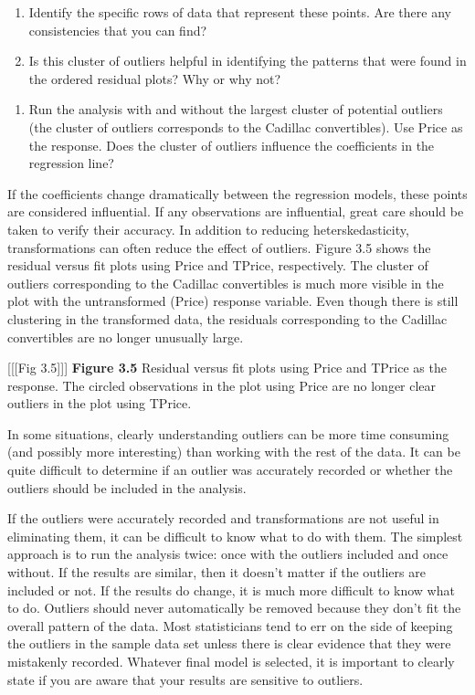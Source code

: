 \documentclass[
]{report}
\providecommand{\tightlist}{%
  \setlength{\itemsep}{0pt}\setlength{\parskip}{0pt}}
\theoremstyle{definition}
\theoremstyle{definition}
\theoremstyle{definition}
\theoremstyle{definition}
\theoremstyle{remark}
\begin{document}
\begin{enumerate}
\def\labelenumi{\alph{enumi}.}
\item
  Identify the specific rows of data that represent these points. Are there any consistencies that you can find?
\item
  Is this cluster of outliers helpful in identifying the patterns that were found in the ordered residual plots? Why or why not?
\end{enumerate}

\begin{enumerate}
\def\labelenumi{\arabic{enumi}.}
\setcounter{enumi}{11}
\tightlist
\item
  Run the analysis with and without the largest cluster of potential outliers (the cluster of outliers corresponds to the Cadillac convertibles). Use Price as the response. Does the cluster of outliers influence the coefficients in the regression line?
\end{enumerate}

If the coefficients change dramatically between the regression models, these points are considered influential. If any observations are influential, great care should be taken to verify their accuracy. In addition to reducing heterskedasticity, transformations can often reduce the effect of outliers. Figure 3.5 shows the residual versus fit plots using Price and TPrice, respectively. The cluster of outliers corresponding to the Cadillac convertibles is much more visible in the plot with the untransformed (Price) response
variable. Even though there is still clustering in the transformed data, the residuals corresponding to the Cadillac convertibles are no longer unusually large.

{[}{[}{[}Fig 3.5{]}{]}{]}
\textbf{Figure 3.5} Residual versus fit plots using Price and TPrice as the response. The circled observations in the plot using Price are no longer clear outliers in the plot using TPrice.

In some situations, clearly understanding outliers can be more time consuming (and possibly more interesting) than working with the rest of the data. It can be quite difficult to determine if an outlier was accurately recorded or whether the outliers should be included in the analysis.

If the outliers were accurately recorded and transformations are not useful in eliminating them, it can be difficult to know what to do with them. The simplest approach is to run the analysis twice: once with the outliers included and once without. If the results are similar, then it doesn't matter if the outliers are included or not. If the results do change, it is much more difficult to know what to do. Outliers should never automatically be removed because they don't fit the overall pattern of the data. Most statisticians tend to err on the side of keeping the outliers in the sample data set unless there is clear evidence that they were mistakenly recorded. Whatever final model is selected, it is important to clearly state if you are aware that your results are sensitive to outliers.
\end{document}

